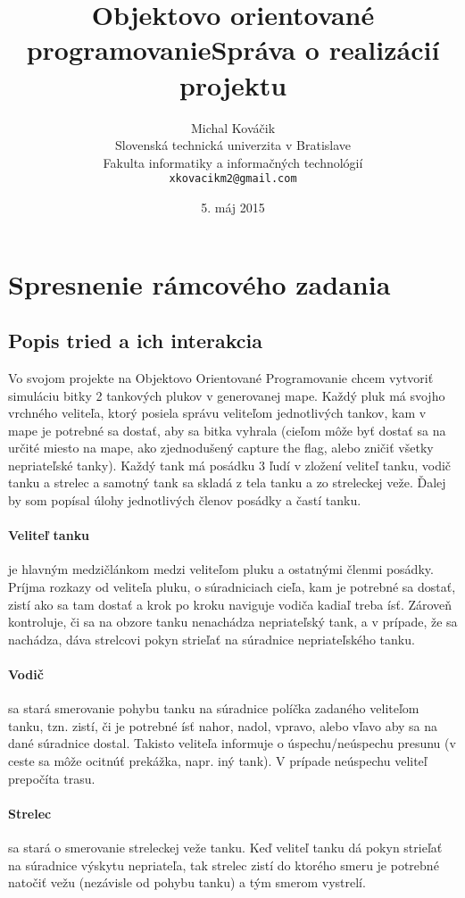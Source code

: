 \documentclass[12pt,oneside,slovak,a4paper]{article}
\title{Objektovo orientované programovanie\linebreak Správa o realizácií projektu}
\author{Michal Kováčik\\[2pt]
	{\small Slovenská technická univerzita v Bratislave}\\
	{\small Fakulta informatiky a informačných technológií}\\
	{\small \texttt{xkovacikm2@gmail.com}}
	}
\date{\small 5. máj 2015}
\begin{document}
\maketitle

\pagebreak
\section{Spresnenie rámcového zadania}
\subsection{Popis tried a ich interakcia}
Vo svojom projekte na Objektovo Orientované Programovanie chcem vytvoriť simuláciu bitky 2 tankových plukov v generovanej mape.
Každý pluk má svojho vrchného veliteľa, ktorý posiela správu veliteľom jednotlivých tankov, kam v mape je potrebné sa dostať, aby sa bitka vyhrala (cieľom môže byť dostať sa na určité miesto na mape, ako zjednodušený capture the flag, alebo zničiť všetky nepriateľské tanky).
Každý tank má posádku 3 ľudí v zložení veliteľ tanku, vodič tanku a strelec a samotný tank sa skladá z tela tanku a zo streleckej veže. Ďalej by som popísal úlohy jednotlivých členov posádky a častí tanku.

\paragraph{Veliteľ tanku} je hlavným medzičlánkom medzi veliteľom pluku a ostatnými členmi posádky. Príjma rozkazy od veliteľa pluku, o súradniciach cieľa, kam je potrebné sa dostať, zistí ako sa tam dostať a krok po kroku naviguje vodiča kadiaľ treba ísť. Zároveň kontroluje, či sa na obzore tanku nenachádza nepriateľský tank, a v prípade, že sa nachádza, dáva strelcovi pokyn strieľať na súradnice nepriateľského tanku.

\paragraph{Vodič} sa stará smerovanie pohybu tanku na súradnice políčka zadaného veliteľom tanku, tzn. zistí, či je potrebné ísť nahor, nadol, vpravo, alebo vľavo aby sa na dané súradnice dostal. Takisto veliteľa informuje o úspechu/neúspechu presunu (v ceste sa môže ocitnúť prekážka, napr. iný tank). V prípade neúspechu veliteľ prepočíta trasu.

\paragraph{Strelec} sa stará o smerovanie streleckej veže tanku. Keď veliteľ tanku dá pokyn strieľať na súradnice výskytu nepriateľa, tak strelec zistí do ktorého smeru je potrebné natočiť vežu (nezávisle od pohybu tanku) a tým smerom vystrelí.
\end{document}
